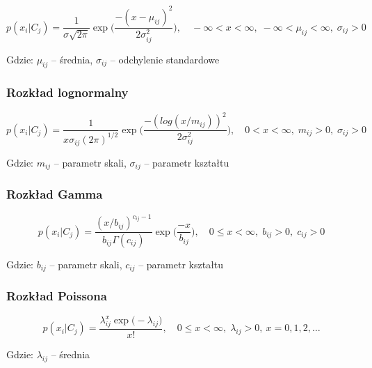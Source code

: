 	\begin{equation}
	\label{eq_gauss}
	p(x_i | C_j) = \frac{1}{\sigma \sqrt{2 \pi}}\exp\bigg(\frac{-(x-\mu_{ij})^2}{2\sigma_{ij}^2}\bigg), \quad
	-\infty < x < \infty, \; -\infty < \mu_{ij} < \infty, \; \sigma_{ij}  > 0
	\end{equation}

\noindent Gdzie: $\mu_{ij}$ -- średnia, $\sigma_{ij}$ -- odchylenie standardowe

\subsubsection{Rozkład lognormalny}
\label{subsec_lognorm}

	\begin{equation}
	\label{eq_lognorm}
	p(x_i | C_j) = \frac{1}{x \sigma_{ij} (2 \pi)^{1/2}} \exp\bigg( \frac{-(log(x/m_{ij}))^2}{2 \sigma_{ij}^2} \bigg), \quad
	0 < x < \infty, \; m_{ij} > 0, \; \sigma_{ij}  > 0
	\end{equation}

\noindent Gdzie: $m_{ij}$ -- parametr skali, $\sigma_{ij}$ -- parametr kształtu

\subsubsection{Rozkład Gamma}
\label{subsec_gamma}

	\begin{equation}
	\label{eq_gamma}
	p(x_i | C_j) = \frac{(x/b_{ij})^{c_{ij}-1}}{b_{ij} \Gamma(c_{ij})} \exp \bigg( \frac{-x}{b_{ij}} \bigg), \quad
	0 \leq x < \infty, \; b_{ij} > 0, \; c_{ij}  > 0
	\end{equation}

\noindent Gdzie: $b_{ij}$ -- parametr skali, $c_{ij}$ -- parametr kształtu
	
\subsubsection{Rozkład Poissona}
\label{subsec_gamma}

	\begin{equation}
	\label{eq_poisson}
	p(x_i | C_j) = \frac{\lambda_{ij}^x \exp \big( -\lambda_{ij} \big)}{x!}, \quad
	0 \leq x < \infty, \; \lambda_{ij} > 0, \: x=0,1,2, \dots
	\end{equation}

\noindent Gdzie: $\lambda_{ij}$ -- średnia